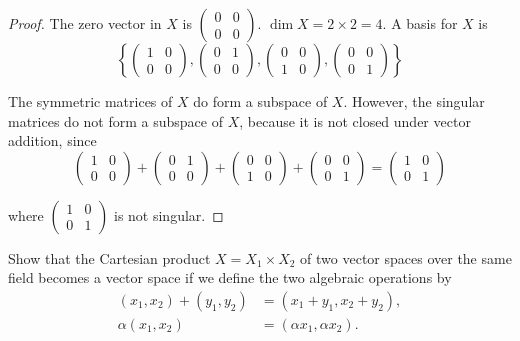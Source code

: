 \begin{proof}
    The zero vector in $X$ is $\begin{pmatrix}0 & 0 \\ 0 & 0\end{pmatrix}$. $\dim X = 2\times 2 = 4$. A basis for $X$ is
    \[
        \left\{
        \begin{pmatrix}1 & 0 \\ 0 & 0\end{pmatrix},
        \begin{pmatrix}0 & 1 \\ 0 & 0\end{pmatrix},
        \begin{pmatrix}0 & 0 \\ 1 & 0\end{pmatrix},
        \begin{pmatrix}0 & 0 \\ 0 & 1\end{pmatrix}
        \right\}
    \]

    The symmetric matrices of $X$ do form a subspace of $X$. However, the singular matrices do not form a subspace of $X$, because it is not closed under vector addition, since
    \[
        \begin{pmatrix}1 & 0 \\ 0 & 0\end{pmatrix} +
        \begin{pmatrix}0 & 1 \\ 0 & 0\end{pmatrix} +
        \begin{pmatrix}0 & 0 \\ 1 & 0\end{pmatrix} +
        \begin{pmatrix}0 & 0 \\ 0 & 1\end{pmatrix} =
        \begin{pmatrix}1 & 0 \\ 0 & 1\end{pmatrix}
    \]

    where $\begin{pmatrix}1 & 0 \\ 0 & 1\end{pmatrix}$ is not singular.
\end{proof}

\begin{exercise}[Product]\label{chapter2:section1:exercise13}
    Show that the Cartesian product $X = X_{1}\times X_{2}$ of two vector spaces over the same field becomes a vector space if we define the two algebraic operations by
    \begin{align*}
        (x_{1}, x_{2}) + (y_{1}, y_{2}) & = (x_{1} + y_{1}, x_{2} + y_{2}), \\
        \alpha (x_{1}, x_{2})           & = (\alpha x_{1}, \alpha x_{2}).
    \end{align*}
\end{exercise}

